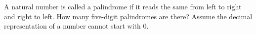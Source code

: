 A natural number is called a palindrome if it reads the same from left to right and right to left. How many five-digit palindromes are there? Assume the decimal representation of a number cannot start with $0$.
